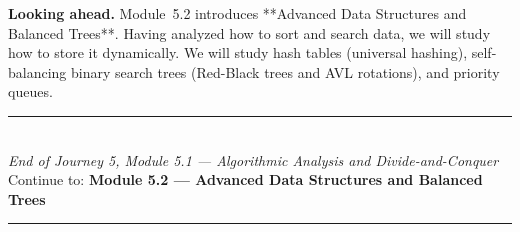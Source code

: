 \documentclass[12pt, a4paper]{book}
\begin{document}
\medskip
\noindent\textbf{Looking ahead.}
Module~5.2 introduces **Advanced Data Structures and Balanced Trees**. Having analyzed how to sort and search data, we will study how to store it dynamically. We will study hash tables (universal hashing), self-balancing binary search trees (Red-Black trees and AVL rotations), and priority queues.

\vspace{1.4cm}
\begin{center}
{\color{JourneyColor}\rule{0.5\linewidth}{0.8pt}}\\[6pt]
{\small\color{JourneyColor}\textit{End of Journey 5, Module 5.1 --- Algorithmic Analysis and Divide-and-Conquer}}\\[4pt]
{\small\color{JourneyColor}Continue to: \textbf{Module 5.2 --- Advanced Data Structures and Balanced Trees}}\\[6pt]
{\color{JourneyColor}\rule{0.5\linewidth}{0.8pt}}
\end{center}
\end{document}

